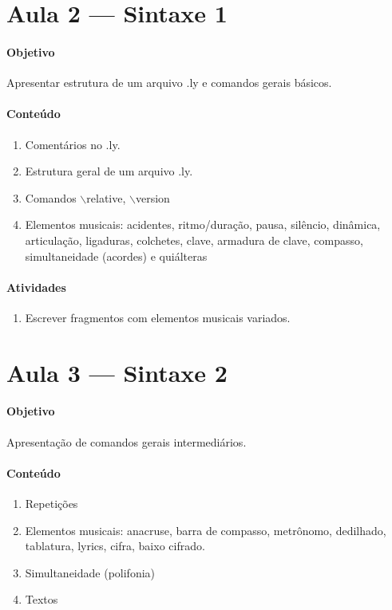 \documentclass[12pt,brazil]{article}
\begin{document}
\section{Aula 2 --- Sintaxe 1}
\paragraph{Objetivo}
Apresentar estrutura de um arquivo .ly e comandos gerais básicos.
\paragraph{Conteúdo}
\begin{enumerate}
\item Comentários no .ly.
\item Estrutura geral de um arquivo .ly.
\item Comandos $\backslash$relative, $\backslash$version
\item Elementos musicais: acidentes, ritmo/duração, pausa, silêncio,
  dinâmica, articulação, ligaduras, colchetes, clave, armadura de
  clave, compasso, simultaneidade (acordes) e quiálteras
\end{enumerate}
\paragraph{Atividades}
\begin{enumerate}
\item Escrever fragmentos com elementos musicais variados.
\end{enumerate}

\section{Aula 3 --- Sintaxe 2}
\paragraph{Objetivo}
Apresentação de comandos gerais intermediários.
\paragraph{Conteúdo}
\begin{enumerate}
\item Repetições
\item Elementos musicais: anacruse, barra de compasso, metrônomo,
  dedilhado, tablatura, lyrics, cifra, baixo cifrado.
\item Simultaneidade (polifonia)
\item Textos
\end{enumerate}
\end{document}
